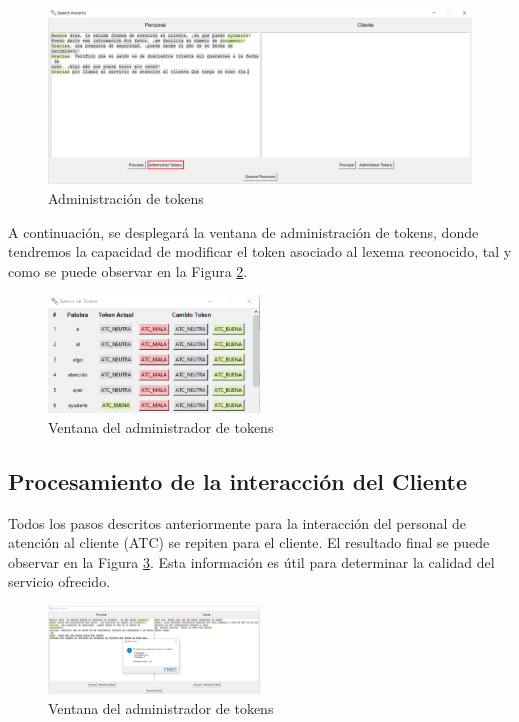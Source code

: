 \documentclass[twocolumn, fontsize=10pt]{article}
\begin{document}
\begin{figure}[h]
    \centering
    \includegraphics[width=\linewidth]{graficas/ATC_paso6.png}
    \caption{Administración de tokens}
    \label{fig:graf_atc_paso6}
\end{figure}

A continuación, se desplegará la ventana de administración de tokens, donde tendremos la capacidad de modificar el token asociado al lexema reconocido, tal y como se puede observar en la Figura \ref{fig:graf_atc_paso7}.

\begin{figure}[h]
    \centering
    \includegraphics[width=0.5\textwidth]{graficas/ATC_paso7.png}
    \caption{Ventana del administrador de tokens}
    \label{fig:graf_atc_paso7}
\end{figure}

\subsection{Procesamiento de la interacción del Cliente}
Todos los pasos descritos anteriormente para la interacción del personal de atención al cliente (ATC) se repiten para el cliente. El resultado final se puede observar en la Figura \ref{fig:graf_cliente_resultados}. Esta información es útil para determinar la calidad del servicio ofrecido.

\begin{figure}[h]
    \centering
    \includegraphics[width=0.5\textwidth]{graficas/cliente_resultados.png}
    \caption{Ventana del administrador de tokens}
    \label{fig:graf_cliente_resultados}
\end{figure}
\end{document}
